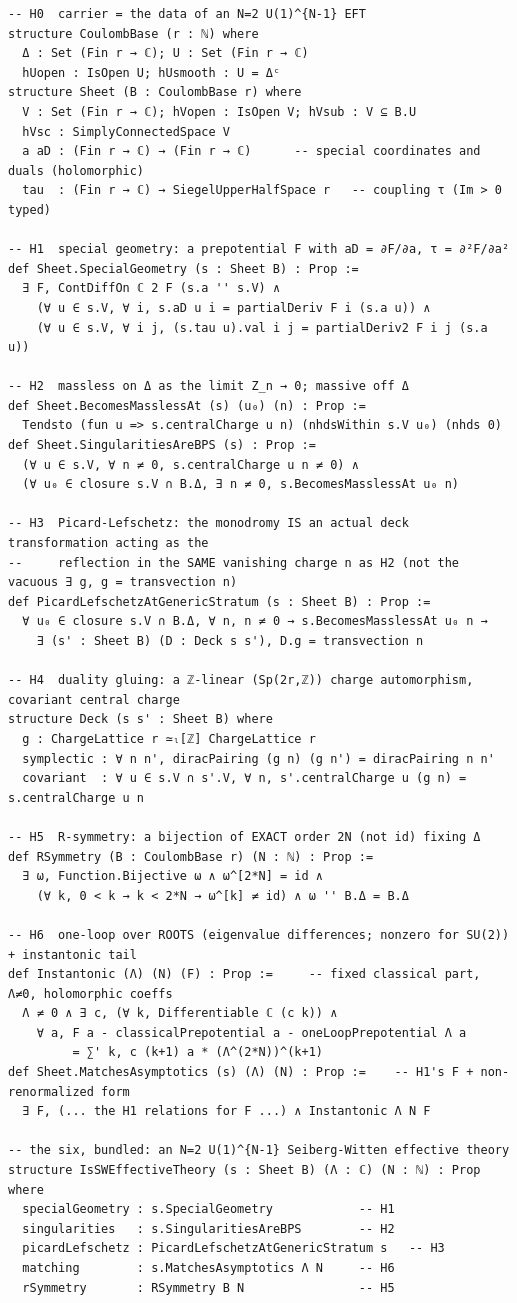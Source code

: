\documentclass[11pt]{article}
\begin{document}
\begin{Verbatim}
-- H0  carrier = the data of an N=2 U(1)^{N-1} EFT
structure CoulombBase (r : ℕ) where
  Δ : Set (Fin r → ℂ); U : Set (Fin r → ℂ)
  hUopen : IsOpen U; hUsmooth : U = Δᶜ
structure Sheet (B : CoulombBase r) where
  V : Set (Fin r → ℂ); hVopen : IsOpen V; hVsub : V ⊆ B.U
  hVsc : SimplyConnectedSpace V
  a aD : (Fin r → ℂ) → (Fin r → ℂ)      -- special coordinates and duals (holomorphic)
  tau  : (Fin r → ℂ) → SiegelUpperHalfSpace r   -- coupling τ (Im > 0 typed)

-- H1  special geometry: a prepotential F with aD = ∂F/∂a, τ = ∂²F/∂a²
def Sheet.SpecialGeometry (s : Sheet B) : Prop :=
  ∃ F, ContDiffOn ℂ 2 F (s.a '' s.V) ∧
    (∀ u ∈ s.V, ∀ i, s.aD u i = partialDeriv F i (s.a u)) ∧
    (∀ u ∈ s.V, ∀ i j, (s.tau u).val i j = partialDeriv2 F i j (s.a u))

-- H2  massless on Δ as the limit Z_n → 0; massive off Δ
def Sheet.BecomesMasslessAt (s) (u₀) (n) : Prop :=
  Tendsto (fun u => s.centralCharge u n) (nhdsWithin s.V u₀) (nhds 0)
def Sheet.SingularitiesAreBPS (s) : Prop :=
  (∀ u ∈ s.V, ∀ n ≠ 0, s.centralCharge u n ≠ 0) ∧
  (∀ u₀ ∈ closure s.V ∩ B.Δ, ∃ n ≠ 0, s.BecomesMasslessAt u₀ n)

-- H3  Picard-Lefschetz: the monodromy IS an actual deck transformation acting as the
--     reflection in the SAME vanishing charge n as H2 (not the vacuous ∃ g, g = transvection n)
def PicardLefschetzAtGenericStratum (s : Sheet B) : Prop :=
  ∀ u₀ ∈ closure s.V ∩ B.Δ, ∀ n, n ≠ 0 → s.BecomesMasslessAt u₀ n →
    ∃ (s' : Sheet B) (D : Deck s s'), D.g = transvection n

-- H4  duality gluing: a ℤ-linear (Sp(2r,ℤ)) charge automorphism, covariant central charge
structure Deck (s s' : Sheet B) where
  g : ChargeLattice r ≃ₗ[ℤ] ChargeLattice r
  symplectic : ∀ n n', diracPairing (g n) (g n') = diracPairing n n'
  covariant  : ∀ u ∈ s.V ∩ s'.V, ∀ n, s'.centralCharge u (g n) = s.centralCharge u n

-- H5  R-symmetry: a bijection of EXACT order 2N (not id) fixing Δ
def RSymmetry (B : CoulombBase r) (N : ℕ) : Prop :=
  ∃ ω, Function.Bijective ω ∧ ω^[2*N] = id ∧
    (∀ k, 0 < k → k < 2*N → ω^[k] ≠ id) ∧ ω '' B.Δ = B.Δ

-- H6  one-loop over ROOTS (eigenvalue differences; nonzero for SU(2)) + instantonic tail
def Instantonic (Λ) (N) (F) : Prop :=     -- fixed classical part, Λ≠0, holomorphic coeffs
  Λ ≠ 0 ∧ ∃ c, (∀ k, Differentiable ℂ (c k)) ∧
    ∀ a, F a - classicalPrepotential a - oneLoopPrepotential Λ a
         = ∑' k, c (k+1) a * (Λ^(2*N))^(k+1)
def Sheet.MatchesAsymptotics (s) (Λ) (N) : Prop :=    -- H1's F + non-renormalized form
  ∃ F, (... the H1 relations for F ...) ∧ Instantonic Λ N F

-- the six, bundled: an N=2 U(1)^{N-1} Seiberg-Witten effective theory
structure IsSWEffectiveTheory (s : Sheet B) (Λ : ℂ) (N : ℕ) : Prop where
  specialGeometry : s.SpecialGeometry            -- H1
  singularities   : s.SingularitiesAreBPS        -- H2
  picardLefschetz : PicardLefschetzAtGenericStratum s   -- H3
  matching        : s.MatchesAsymptotics Λ N     -- H6
  rSymmetry       : RSymmetry B N                -- H5
\end{Verbatim}
\end{document}
